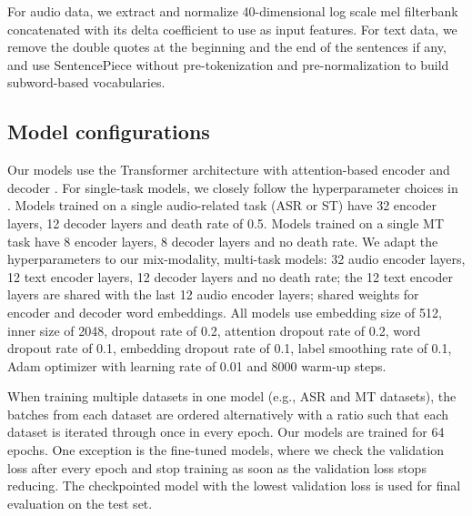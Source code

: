 \documentclass[conference]{IEEEtran}
\begin{document}
	
	
	For audio data, we extract and normalize 40-dimensional log scale mel filterbank concatenated with its delta coefficient to use as input features. For text data, we remove the double quotes at the beginning and the end of the sentences if any, and use SentencePiece \cite{sentencepiece} without pre-tokenization and pre-normalization to build subword-based vocabularies. 
	
	\subsection{Model configurations}
	Our models use the Transformer architecture with attention-based encoder and decoder \cite{attention, quan-2019-very-deep}. For single-task models, we closely follow the hyperparameter choices in \cite{pham2019iwslt}. Models trained on a single audio-related task (ASR or ST) have 32 encoder layers, 12 decoder layers and death rate of 0.5. Models trained on a single MT task have 8 encoder layers, 8 decoder layers and no death rate. We adapt the hyperparameters to our mix-modality, multi-task models: 32 audio encoder layers, 12 text encoder layers, 12 decoder layers and no death rate; the 12 text encoder layers are shared with the last 12 audio encoder layers; shared weights for encoder and decoder word embeddings. All models use embedding size of 512, inner size of 2048, dropout rate of 0.2, attention dropout rate of 0.2, word dropout rate of 0.1, embedding dropout rate of 0.1, label smoothing rate of 0.1, Adam optimizer with learning rate of 0.01 and 8000 warm-up steps. 
	
	When training multiple datasets in one model (e.g., ASR and MT datasets), the batches from each dataset are ordered alternatively with a ratio such that each dataset is iterated through once in every epoch. Our models are trained for 64 epochs. One exception is the fine-tuned models, where we check the validation loss after every epoch and stop training as soon as the validation loss stops reducing. The checkpointed model with the lowest validation loss is used for final evaluation on the test set.
	
\end{document}

